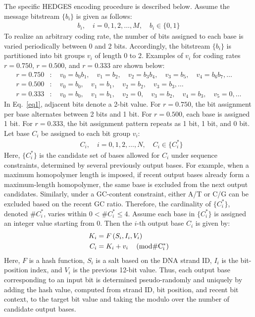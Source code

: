 \documentclass[sotsuron]{kuee}
\begin{document}
The specific HEDGES encoding procedure is described below.
Assume the message bitstream $\{b_i\}$ is given as follows:
\begin{align}
  b_i, \quad i=0,1,2,\ldots, M, \quad b_i \in \{0,1\}
\end{align}
To realize an arbitrary coding rate, the number of bits assigned to each base
is varied periodically between 0 and 2 bits.
Accordingly, the bitstream $\{b_i\}$ is partitioned into bit groups $v_i$ of
length 0 to 2.
Examples of $v_i$ for coding rates $r=0.750$, $r=0.500$, and $r=0.333$ are
shown below:
\begin{align}
  r=0.750&: \quad v_0 = b_0b_1, \quad v_1 = b_2, \quad v_2 = b_3b_4, \quad v_3 = b_5, \quad v_4 = b_6b_7, \ldots \label{eq1} \\
  r=0.500&: \quad v_0 = b_0, \quad v_1 = b_1, \quad v_2 = b_2, \quad v_3 = b_3, \ldots \\
  r=0.333&: \quad v_0 = b_0, \quad v_1 = b_1, \quad v_2 = 0, \quad v_3 = b_2, \quad v_4 = b_3, \quad v_5 = 0, \ldots
\end{align}
In Eq.~\eqref{eq1}, adjacent bits denote a 2-bit value.
For $r=0.750$, the bit assignment per base alternates between 2 bits and 1 bit.
For $r=0.500$, each base is assigned 1 bit.
For $r=0.333$, the bit assignment pattern repeats as 1 bit, 1 bit, and 0 bit.
Let base $C_i$ be assigned to each bit group $v_i$:
\begin{align}
  &C_i, \quad i=0,1,2,\ldots ,N, \quad C_i \in \{C_i^*\}
\end{align}
Here, $\{C_i^*\}$ is the candidate set of bases allowed for $C_i$ under
sequence constraints, determined by several previously output bases.
For example, when a maximum homopolymer length is imposed, if recent output
bases already form a maximum-length homopolymer, the same base is excluded from
the next output candidates.
Similarly, under a GC-content constraint, either A/T or C/G can be excluded
based on the recent GC ratio.
Therefore, the cardinality of $\{C_i^*\}$, denoted $\#C_i^*$, varies within
$0 < \#C_i^* \leq 4$.
Assume each base in $\{C_i^*\}$ is assigned an integer value starting from 0.
Then the $i$-th output base $C_i$ is given by:
\begin{align}
  K_i &= F\left( S_i, I_i, V_i \right) \\
  C_i &=  K_i + v_i  \quad \left(\rm{mod} \#C_i^*\right) \label{encode}
\end{align}
Here, $F$ is a hash function, $S_i$ is a salt based on the DNA strand ID,
$I_i$ is the bit-position index, and $V_i$ is the previous 12-bit value.
Thus, each output base corresponding to an input bit is determined
pseudo-randomly and uniquely by adding the hash value, computed from strand ID,
bit position, and recent bit context, to the target bit value and taking the
modulo over the number of candidate output bases.
\end{document}
